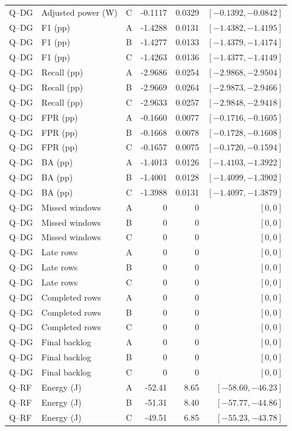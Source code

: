 \begin{longtable}{lllrrr}
Q--DG & Adjusted power (W) & C & -0.1117 & 0.0329 & $[-0.1392,-0.0842]$\\
Q--DG & F1 (pp) & A & -1.4288 & 0.0131 & $[-1.4382,-1.4195]$\\
Q--DG & F1 (pp) & B & -1.4277 & 0.0133 & $[-1.4379,-1.4174]$\\
Q--DG & F1 (pp) & C & -1.4263 & 0.0136 & $[-1.4377,-1.4149]$\\
Q--DG & Recall (pp) & A & -2.9686 & 0.0254 & $[-2.9868,-2.9504]$\\
Q--DG & Recall (pp) & B & -2.9669 & 0.0264 & $[-2.9873,-2.9466]$\\
Q--DG & Recall (pp) & C & -2.9633 & 0.0257 & $[-2.9848,-2.9418]$\\
Q--DG & FPR (pp) & A & -0.1660 & 0.0077 & $[-0.1716,-0.1605]$\\
Q--DG & FPR (pp) & B & -0.1668 & 0.0078 & $[-0.1728,-0.1608]$\\
Q--DG & FPR (pp) & C & -0.1657 & 0.0075 & $[-0.1720,-0.1594]$\\
Q--DG & BA (pp) & A & -1.4013 & 0.0126 & $[-1.4103,-1.3922]$\\
Q--DG & BA (pp) & B & -1.4001 & 0.0128 & $[-1.4099,-1.3902]$\\
Q--DG & BA (pp) & C & -1.3988 & 0.0131 & $[-1.4097,-1.3879]$\\
Q--DG & Missed windows & A & 0 & 0 & $[0,0]$\\
Q--DG & Missed windows & B & 0 & 0 & $[0,0]$\\
Q--DG & Missed windows & C & 0 & 0 & $[0,0]$\\
Q--DG & Late rows & A & 0 & 0 & $[0,0]$\\
Q--DG & Late rows & B & 0 & 0 & $[0,0]$\\
Q--DG & Late rows & C & 0 & 0 & $[0,0]$\\
Q--DG & Completed rows & A & 0 & 0 & $[0,0]$\\
Q--DG & Completed rows & B & 0 & 0 & $[0,0]$\\
Q--DG & Completed rows & C & 0 & 0 & $[0,0]$\\
Q--DG & Final backlog & A & 0 & 0 & $[0,0]$\\
Q--DG & Final backlog & B & 0 & 0 & $[0,0]$\\
Q--DG & Final backlog & C & 0 & 0 & $[0,0]$\\
Q--RF & Energy (J) & A & -52.41 & 8.65 & $[-58.60,-46.23]$\\
Q--RF & Energy (J) & B & -51.31 & 8.40 & $[-57.77,-44.86]$\\
Q--RF & Energy (J) & C & -49.51 & 6.85 & $[-55.23,-43.78]$\\

\end{longtable}
